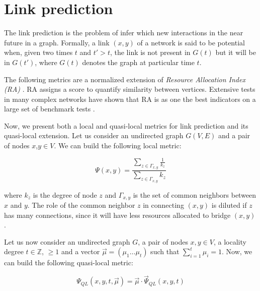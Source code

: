 \section{Link prediction}
\label{sec:link-prediction}

The link prediction is the problem of infer which new interactions in the near future in a graph. Formally, a link $(x,y)$ of a network is said to be potential when, given two times $t$ and $t'>t$, the link is not present in $G(t)$ but it will be in $G(t')$, where $G(t)$ denotes the graph at particular time $t$. 

The following metrics are a normalized extension of \textit{Resource Allocation Index (RA)} \cite{berlusconi2016link, Lu2011,zhou2009predicting}. RA assigns a score to quantify similarity between vertices. Extensive tests in many complex networks have shown that RA is as one the best indicators on a large set of benchmark tests  \cite{berlusconi2016link,Lu2011}.

Now, we present both a local and quasi-local metrics for link prediction and its quasi-local extension.
Let us consider an undirected graph $G(V,E)$ and a pair of nodes $x$,$y\in V$. We can build the following local metric:

\begin{equation}
\label{eqn:prediction-local}
\Psi(x,y)=
\frac{\sum\limits_{z\in\Gamma_{x,y}}\frac{1}{k_{z}}}
{\sum\limits_{z\in\Gamma_{x,y}}k_{z}}
\end{equation}

where $k_{z}$ is the degree of node $z$ and $\Gamma_{x,y}$ is the set of common neighbors between $x$ and $y$. The role of the common neighbor $z$ in connecting $(x, y)$ is diluted if $z$ has many connections, since it will have less resources allocated to bridge $(x, y)$ \cite{berlusconi2016link}.

Let us now consider an undirected graph $G$, a pair of nodes $x,y\in V$, a locality degree $t\in \mathbb{Z}$, $\geq 1$ and a vector $\vec{\mu}=(\mu_{1}\ldots\mu_{t})$ such that $\sum_{i=1}^{t}\mu_{i}=1$. 
Now, we can build the following quasi-local metric:

\begin{equation}
\label{eqn:prediction-quasi-local-1}
\Psi_{QL}(x,y,t,\vec{\mu})=\vec{\mu}\cdot\vec{\Psi}_{QL}(x,y,t)
\end{equation}

